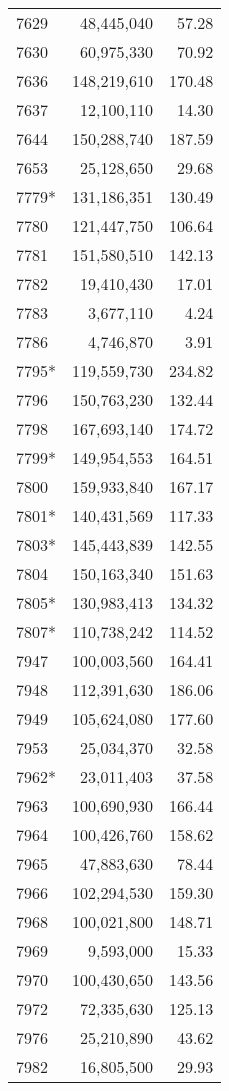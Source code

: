 \documentclass[11pt]{article}
\begin{document}
\begin{longtable}[!hbtp]{l r r}
7629	&	48,445,040	&	57.28	\\
7630	&	60,975,330	&	70.92	\\
7636	&	148,219,610	&	170.48	\\
7637	&	12,100,110	&	14.30	\\
7644	&	150,288,740	&	187.59	\\
7653	&	25,128,650	&	29.68	\\
7779*	&	131,186,351	&	130.49	\\
7780	&	121,447,750	&	106.64	\\
7781	&	151,580,510	&	142.13	\\
7782	&	19,410,430	&	17.01	\\
7783	&	3,677,110	&	4.24	\\
7786	&	4,746,870	&	3.91	\\
7795*	&	119,559,730	&	234.82	\\
7796	&	150,763,230	&	132.44	\\
7798	&	167,693,140	&	174.72	\\
7799*	&	149,954,553	&	164.51	\\
7800	&	159,933,840	&	167.17	\\
7801*	&	140,431,569	&	117.33	\\
7803*	&	145,443,839	&	142.55	\\
7804	&	150,163,340	&	151.63	\\
7805*	&	130,983,413	&	134.32	\\
7807*	&	110,738,242	&	114.52	\\
7947	&	100,003,560	&	164.41	\\
7948	&	112,391,630	&	186.06	\\
7949	&	105,624,080	&	177.60	\\
7953	&	25,034,370	&	32.58	\\
7962*	&	23,011,403	&	37.58	\\
7963	&	100,690,930	&	166.44	\\
7964	&	100,426,760	&	158.62	\\
7965	&	47,883,630	&	78.44	\\
7966	&	102,294,530	&	159.30	\\
7968	&	100,021,800	&	148.71	\\
7969	&	9,593,000	&	15.33	\\
7970	&	100,430,650	&	143.56	\\
7972	&	72,335,630	&	125.13	\\
7976	&	25,210,890	&	43.62	\\
7982	&	16,805,500	&	29.93	\\

\end{longtable}
\end{document}
